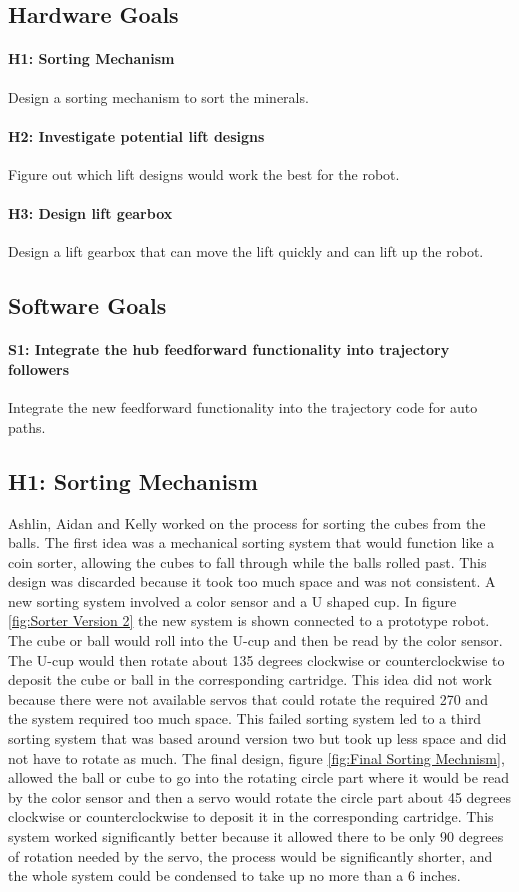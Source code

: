 \documentclass{article}
\begin{document}
\subsection{Hardware Goals}
\paragraph{H1: Sorting Mechanism}
 Design a sorting mechanism to sort the minerals. 
\paragraph{H2: Investigate potential lift designs}
 Figure out which lift designs would work the best for the robot. 
\paragraph{H3: Design lift gearbox}
 Design a lift gearbox that can move the lift quickly and can lift up the robot. 
\subsection{Software Goals}
\paragraph{S1: Integrate the hub feedforward functionality into trajectory followers}
Integrate the new feedforward functionality into the trajectory code for auto paths.
\newpage
\subsection{H1: Sorting Mechanism}

Ashlin, Aidan and Kelly worked on the process for sorting the cubes from the balls. The first idea was a mechanical sorting system that would function like a coin sorter, allowing the cubes to fall through while the balls rolled past. This design was discarded because it took too much space and was not consistent. A new sorting system involved a color sensor and a U shaped cup. In figure \ref{fig:Sorter Version 2} the new system is shown connected to a prototype robot. The cube or ball would roll into the U-cup and then be read by the color sensor. The U-cup would then rotate about 135 degrees clockwise or counterclockwise to deposit the cube or ball in the corresponding cartridge. This idea did not work because there were not available servos that could rotate the required 270 and the system required too much space. This failed sorting system led to a third sorting system that was based around version two but took up less space and did not have to rotate as much. The final design, figure \ref{fig:Final Sorting Mechnism}, allowed the ball or cube to go into the rotating circle part where it would be read by the color sensor and then a servo would rotate the circle part about 45 degrees clockwise or counterclockwise to deposit it in the corresponding cartridge. This system worked significantly better because it allowed there to be only 90 degrees of rotation needed by the servo, the process would be significantly shorter, and the whole system could be condensed to take up no more than a 6 inches.
\end{document}
